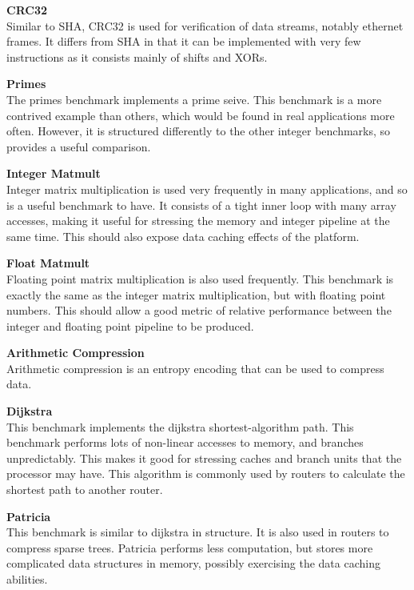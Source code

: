 \documentclass[twocolumn]{article}
\begin{document}
\vspace{3mm}
\textbf{CRC32}\\
Similar to SHA, CRC32 is used for verification of data streams, notably ethernet frames. It differs from SHA in that it can be implemented with very few instructions as it consists mainly of shifts and XORs.

\vspace{3mm}
\textbf{Primes}\\
The primes benchmark implements a prime seive. This benchmark is a more contrived example than others, which would be found in real applications more often. However, it is structured differently to the other integer benchmarks, so provides a useful comparison.

\vspace{3mm}
\textbf{Integer Matmult}\\
Integer matrix multiplication is used very frequently in many applications, and so is a useful benchmark to have. It consists of a tight inner loop with many array accesses, making it useful for stressing the memory and integer pipeline at the same time. This should also expose data caching effects of the platform.

\vspace{3mm}
\textbf{Float Matmult}\\
Floating point matrix multiplication is also used frequently. This benchmark is exactly the same as the integer matrix multiplication, but with floating point numbers. This should allow a good metric of relative performance between the integer and floating point pipeline to be produced.

\vspace{3mm}
\textbf{Arithmetic Compression}\\
Arithmetic compression is an entropy encoding that can be used to compress data.

\vspace{3mm}
\textbf{Dijkstra}\\
This benchmark implements the dijkstra shortest-algorithm path. This benchmark performs lots of non-linear accesses to memory, and branches unpredictably. This makes it good for stressing caches and branch units that the processor may have. This algorithm is commonly used by routers to calculate the shortest path to another router.

\vspace{3mm}
\textbf{Patricia}\\
This benchmark is similar to dijkstra in structure. It is also used in routers to compress sparse trees. Patricia performs less computation, but stores more complicated data structures in memory, possibly exercising the data caching abilities.
\end{document}
